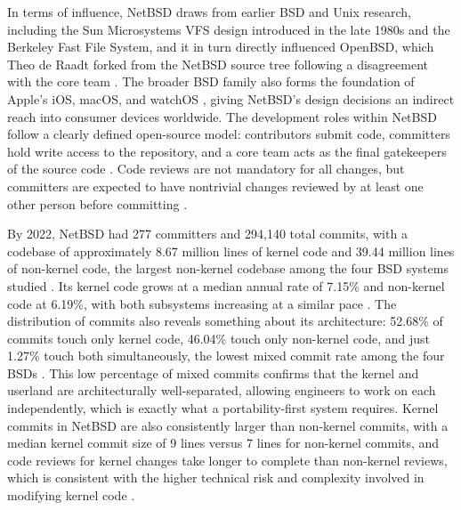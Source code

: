 In terms of influence, NetBSD draws from earlier BSD and Unix research, including the Sun Microsystems VFS design introduced in the
late 1980s and the Berkeley Fast File System, and it in turn directly influenced OpenBSD, which Theo de Raadt forked from the NetBSD
source tree following a disagreement with the core team \parencite{thomas_rantugi2022}. The broader BSD family also forms the foundation
of Apple's iOS, macOS, and watchOS \parencite{thomas_rantugi2022}, giving NetBSD's design decisions an indirect reach into consumer devices
worldwide. The development roles within NetBSD follow a clearly defined open-source model: contributors submit code, committers hold
write access to the repository, and a core team acts as the final gatekeepers of the source code \parencite{thomas_rantugi2022}. Code reviews
are not mandatory for all changes, but committers are expected to have nontrivial changes reviewed by at least one other person before
committing \parencite{thomas_rantugi2022}.

By 2022, NetBSD had 277 committers and 294,140 total commits, with a codebase of approximately 8.67 million lines of kernel code and
39.44 million lines of non-kernel code, the largest non-kernel codebase among the four BSD systems studied \parencite{thomas_rantugi2022}.
Its kernel code grows at a median annual rate of 7.15\% and non-kernel code at 6.19\%, with both subsystems increasing at a similar
pace \parencite{thomas_rantugi2022}. The distribution of commits also reveals something about its architecture: 52.68\% of commits touch
only kernel code, 46.04\% touch only non-kernel code, and just 1.27\% touch both simultaneously, the lowest mixed commit rate among
the four BSDs \parencite{thomas_rantugi2022}. This low percentage of mixed commits confirms that the kernel and userland are architecturally
well-separated, allowing engineers to work on each independently, which is exactly what a portability-first system requires. Kernel
commits in NetBSD are also consistently larger than non-kernel commits, with a median kernel commit size of 9 lines versus 7 lines for
non-kernel commits, and code reviews for kernel changes take longer to complete than non-kernel reviews, which is consistent with the
higher technical risk and complexity involved in modifying kernel code \parencite{thomas_rantugi2022}.
